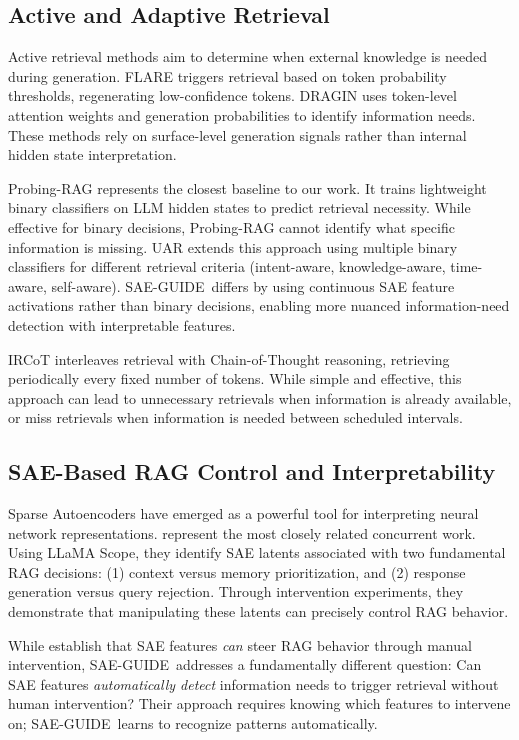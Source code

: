 \documentclass{article}
\newcommand{\ours}{SAE-GUIDE}
\begin{document}
\subsection{Active and Adaptive Retrieval}

Active retrieval methods aim to determine when external knowledge is needed during generation. FLARE \citep{jiang2023flare} triggers retrieval based on token probability thresholds, regenerating low-confidence tokens. DRAGIN \citep{su2024dragin} uses token-level attention weights and generation probabilities to identify information needs. These methods rely on surface-level generation signals rather than internal hidden state interpretation.

Probing-RAG \citep{probingrag2024} represents the closest baseline to our work. It trains lightweight binary classifiers on LLM hidden states to predict retrieval necessity. While effective for binary decisions, Probing-RAG cannot identify what specific information is missing. UAR \citep{cheng2024uar} extends this approach using multiple binary classifiers for different retrieval criteria (intent-aware, knowledge-aware, time-aware, self-aware). \ours\ differs by using continuous SAE feature activations rather than binary decisions, enabling more nuanced information-need detection with interpretable features.

IRCoT \citep{trivedi2023ircot} interleaves retrieval with Chain-of-Thought reasoning, retrieving periodically every fixed number of tokens. While simple and effective, this approach can lead to unnecessary retrievals when information is already available, or miss retrievals when information is needed between scheduled intervals.

\subsection{SAE-Based RAG Control and Interpretability}

Sparse Autoencoders have emerged as a powerful tool for interpreting neural network representations. \citet{xin-etal-2025-sparse} represent the most closely related concurrent work. Using LLaMA Scope, they identify SAE latents associated with two fundamental RAG decisions: (1) context versus memory prioritization, and (2) response generation versus query rejection. Through intervention experiments, they demonstrate that manipulating these latents can precisely control RAG behavior.

While \citet{xin-etal-2025-sparse} establish that SAE features \textit{can} steer RAG behavior through manual intervention, \ours\ addresses a fundamentally different question: Can SAE features \textit{automatically detect} information needs to trigger retrieval without human intervention? Their approach requires knowing which features to intervene on; \ours\ learns to recognize patterns automatically.
\end{document}
